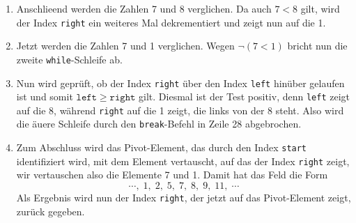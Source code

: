 \begin{enumerate}
\item Anschlie\3end werden die Zahlen 7 und 8 verglichen.  Da auch $7 < 8$ gilt, wird der
      Index \texttt{right} ein weiteres Mal dekrementiert und zeigt nun auf die 1.
\item Jetzt werden die Zahlen 7 und 1 verglichen.  Wegen $\neg (7 < 1)$ bricht nun die
      zweite \texttt{while}-Schleife ab.
\item Nun wird gepr\"uft, ob der Index \texttt{right} \"uber den Index
      \texttt{left} hin\"uber gelaufen ist und somit $\mathtt{left} \geq \mathtt{right}$
      gilt.  Diesmal ist der Test positiv, denn \texttt{left} zeigt auf die 8,
      w\"ahrend \texttt{right} auf die 1 zeigt, die links von der 8 steht.
      Also wird die \"au\3ere Schleife durch den \texttt{break}-Befehl in Zeile 28
      abgebrochen.
\item Zum Abschluss wird das Pivot-Element, das durch den Index \texttt{start}
      identifiziert wird, mit dem Element vertauscht, auf das der Index \texttt{right}
      zeigt,  wir vertauschen also die Elemente 7 und 1.  Damit hat das Feld die Form
      \[ \cdots,\; 1,\; 2,\; 5,\; 7,\; 8,\; 9,\; 11,\;\cdots \]
      Als Ergebnis wird nun der Index \texttt{right}, der jetzt auf das Pivot-Element
      zeigt, zur\"uck gegeben.
\end{enumerate}
 
